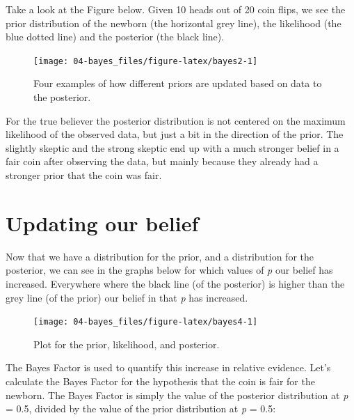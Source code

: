\documentclass[
  oneside]{book}
\begin{document}
Take a look at the Figure below. Given 10 heads out of 20 coin flips, we see the prior distribution of the newborn (the horizontal grey line), the likelihood (the blue dotted line) and the posterior (the black line).



\begin{figure}

{\centering \texttt{[image: 04-bayes\_files/figure-latex/bayes2-1]} 

}

\caption{Four examples of how different priors are updated based on data to the posterior.}\label{fig:bayes2}
\end{figure}

For the true believer the posterior distribution is not centered on the maximum likelihood of the observed data, but just a bit in the direction of the prior. The slightly skeptic and the strong skeptic end up with a much stronger belief in a fair coin after observing the data, but mainly because they already had a stronger prior that the coin was fair.

\hypertarget{updating-our-belief}{%
\section{Updating our belief}\label{updating-our-belief}}

Now that we have a distribution for the prior, and a distribution for the posterior, we can see in the graphs below for which values of \emph{p} our belief has increased. Everywhere where the black line (of the posterior) is higher than the grey line (of the prior) our belief in that \emph{p} has increased.



\begin{figure}

{\centering \texttt{[image: 04-bayes\_files/figure-latex/bayes4-1]} 

}

\caption{Plot for the prior, likelihood, and posterior.}\label{fig:bayes4}
\end{figure}

The Bayes Factor is used to quantify this increase in relative evidence. Let's calculate the Bayes Factor for the hypothesis that the coin is fair for the newborn. The Bayes Factor is simply the value of the posterior distribution at \emph{p} = 0.5, divided by the value of the prior distribution at \emph{p} = 0.5:
\end{document}
